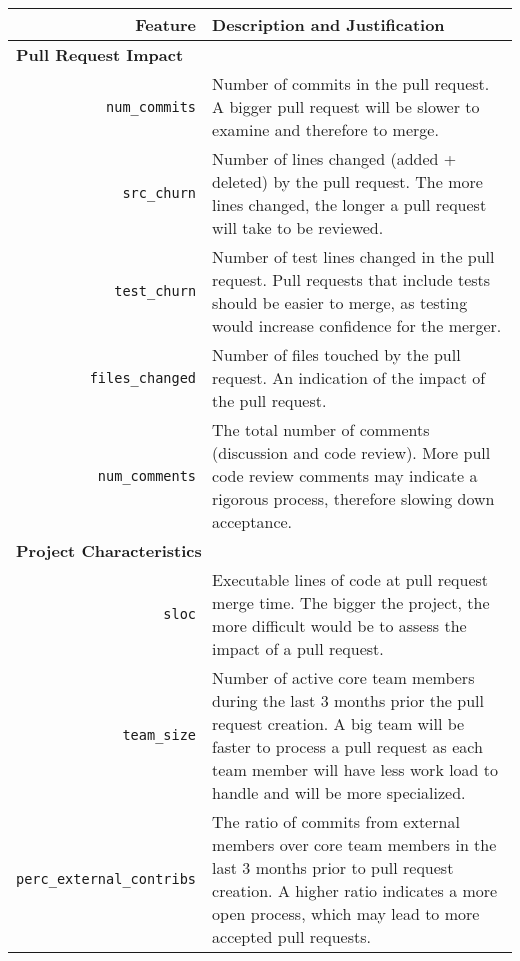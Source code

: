 \documentclass{sig-alternate}
\begin{document}
\begin{table*}
  \begin{small}
  \centering
  \begin{tabular}{rp{40em}}
    \hline
    \bf{Feature} & \bf{Description and Justification}\\
    \hline
    \multicolumn{2}{l}{\bf{Pull Request Impact}}\\
    
    \texttt{num\_commits} & Number of commits in the pull request. A bigger
    pull request will be slower to examine and therefore to merge.\\
    
    \texttt{src\_churn} & Number of lines changed (added + deleted) by the pull
    request. The more lines changed, the longer a pull request will take to be
    reviewed.\\

    \texttt{test\_churn} & Number of test lines changed in the pull request. Pull requests
    that include tests should be easier to merge, as testing would increase
    confidence for the merger.\\
    
    \texttt{files\_changed} & Number of files touched by the pull request. An
    indication of the impact of the pull request.\\
    
    \texttt{num\_comments} & The total number of comments (discussion and code
    review). More pull code review comments may indicate a rigorous process,
    therefore slowing down acceptance.\\

    \multicolumn{2}{l}{\bf{Project Characteristics}}\\
    
    \texttt{sloc} & Executable lines of code at pull request merge time. The
    bigger the project, the more difficult would be to assess the impact of
    a pull request. \\

    \texttt{team\_size} & Number of active core team members during the last
    3 months prior the pull request creation. A big team will be faster to process a
    pull request as each team member will have less work load to handle and
    will be more specialized.\\

    \texttt{perc\_external\_contribs} & The ratio of commits from external
    members over core team members in the last 3 months prior to pull request
    creation. A higher ratio indicates a more open
    process, which may lead to more accepted pull requests.\\


\end{tabular}
\end{small}
\end{table*}
\end{document}
